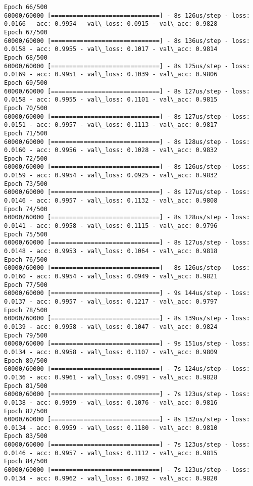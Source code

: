 \documentclass[11pt]{article}
\begin{document}
\begin{Verbatim}[commandchars=\\\{\}]
Epoch 66/500
60000/60000 [==============================] - 8s 126us/step - loss: 0.0166 - acc: 0.9954 - val\_loss: 0.0915 - val\_acc: 0.9828
Epoch 67/500
60000/60000 [==============================] - 8s 136us/step - loss: 0.0158 - acc: 0.9955 - val\_loss: 0.1017 - val\_acc: 0.9814
Epoch 68/500
60000/60000 [==============================] - 8s 125us/step - loss: 0.0169 - acc: 0.9951 - val\_loss: 0.1039 - val\_acc: 0.9806
Epoch 69/500
60000/60000 [==============================] - 8s 127us/step - loss: 0.0158 - acc: 0.9955 - val\_loss: 0.1101 - val\_acc: 0.9815
Epoch 70/500
60000/60000 [==============================] - 8s 127us/step - loss: 0.0151 - acc: 0.9957 - val\_loss: 0.1113 - val\_acc: 0.9817
Epoch 71/500
60000/60000 [==============================] - 8s 128us/step - loss: 0.0160 - acc: 0.9956 - val\_loss: 0.1028 - val\_acc: 0.9832
Epoch 72/500
60000/60000 [==============================] - 8s 126us/step - loss: 0.0159 - acc: 0.9954 - val\_loss: 0.0925 - val\_acc: 0.9832
Epoch 73/500
60000/60000 [==============================] - 8s 127us/step - loss: 0.0146 - acc: 0.9957 - val\_loss: 0.1132 - val\_acc: 0.9808
Epoch 74/500
60000/60000 [==============================] - 8s 128us/step - loss: 0.0141 - acc: 0.9958 - val\_loss: 0.1115 - val\_acc: 0.9796
Epoch 75/500
60000/60000 [==============================] - 8s 127us/step - loss: 0.0148 - acc: 0.9953 - val\_loss: 0.1064 - val\_acc: 0.9818
Epoch 76/500
60000/60000 [==============================] - 8s 126us/step - loss: 0.0160 - acc: 0.9954 - val\_loss: 0.0949 - val\_acc: 0.9821
Epoch 77/500
60000/60000 [==============================] - 9s 144us/step - loss: 0.0137 - acc: 0.9957 - val\_loss: 0.1217 - val\_acc: 0.9797
Epoch 78/500
60000/60000 [==============================] - 8s 139us/step - loss: 0.0139 - acc: 0.9958 - val\_loss: 0.1047 - val\_acc: 0.9824
Epoch 79/500
60000/60000 [==============================] - 9s 151us/step - loss: 0.0134 - acc: 0.9958 - val\_loss: 0.1107 - val\_acc: 0.9809
Epoch 80/500
60000/60000 [==============================] - 7s 124us/step - loss: 0.0136 - acc: 0.9961 - val\_loss: 0.0991 - val\_acc: 0.9828
Epoch 81/500
60000/60000 [==============================] - 7s 123us/step - loss: 0.0138 - acc: 0.9959 - val\_loss: 0.1076 - val\_acc: 0.9816
Epoch 82/500
60000/60000 [==============================] - 8s 132us/step - loss: 0.0134 - acc: 0.9959 - val\_loss: 0.1180 - val\_acc: 0.9810
Epoch 83/500
60000/60000 [==============================] - 7s 123us/step - loss: 0.0146 - acc: 0.9957 - val\_loss: 0.1112 - val\_acc: 0.9815
Epoch 84/500
60000/60000 [==============================] - 7s 123us/step - loss: 0.0134 - acc: 0.9962 - val\_loss: 0.1092 - val\_acc: 0.9820

\end{Verbatim}
\end{document}

